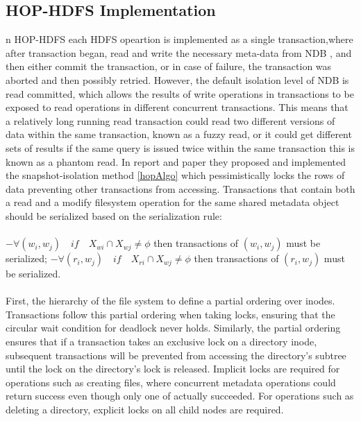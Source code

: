 \subsection{HOP-HDFS Implementation}
n HOP-HDFS each HDFS opeartion is implemented as a single transaction,where after transaction began, read and write the necessary meta-data from NDB , and then either commit the transaction, or in case of failure, the transaction was aborted and then possibly retried. However,  the  default  isolation  level  of  NDB  is   read  committed,  which  allows   the  results   of
write  operations   in  transactions   to  be  exposed  to  read  operations   in  different  concurrent
transactions.  This   means   that  a  relatively   long  running  read  transaction  could  read  two
different  versions   of  data  within  the  same  transaction,  known  as  a fuzzy  read, or it could get
different  sets   of  results   if the same query  is  issued twice within the same transaction  this  is
known as a phantom read. In report\cite{12} and paper \cite{hoppaper} they proposed and implemented the snapshot-isolation method \ref{hopAlgo} which pessimistically locks the rows of data preventing other transactions from accessing. 
Transactions that contain both a read and a modify filesystem operation for the same shared metadata object should be serialized based on the serialization rule:\\\\
$ -\forall(w_{i},w_{j}) \hspace{1em} if \hspace{1em} X_{wi}\cap X_{wj} \neq \phi$ then transactions of $ (w_{i},w_{j})$ must be serialized; $
-\forall(r_{i},w_{j})  \hspace{1em} if \hspace{1em} X_{ri}\cap X_{wj} \neq \phi$ then transactions of $(r_{i},w_{j})$  must be serialized.\\\\
First, the hierarchy of the file system to define a partial ordering over
inodes. Transactions follow this partial ordering when taking locks, ensuring
that the circular wait condition for deadlock never holds. Similarly, the partial
ordering ensures that if a transaction takes an exclusive lock on a directory inode,
subsequent transactions will be prevented from accessing the directory's subtree
until the lock on the directory's lock is released. Implicit locks are required for
operations such as creating files, where concurrent metadata operations could
return success even though only one of actually succeeded. For operations such
as deleting a directory, explicit locks on all child nodes are required.

